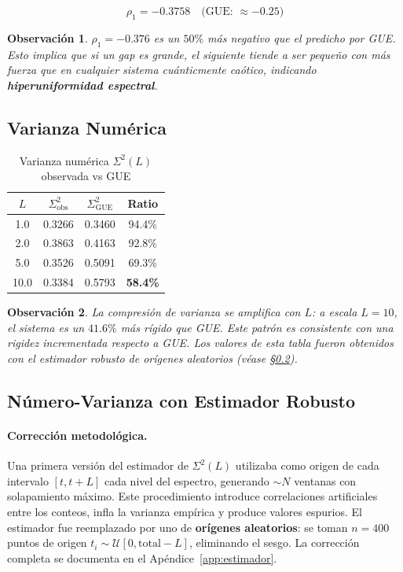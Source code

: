 \documentclass[12pt, a4paper]{article}
\newtheorem{observacion}{Observación}
\begin{document}
\[
  \rho_1 = -0.3758 \quad \text{(GUE: } \approx -0.25\text{)}
\]

\begin{observacion}
$\rho_1 = -0.376$ es un $50\%$ más negativo que el predicho por GUE.
Esto implica que si un gap es grande, el siguiente tiende a ser pequeño
con más fuerza que en cualquier sistema cuánticmente caótico, indicando
\textbf{hiperuniformidad espectral}.
\end{observacion}

\subsection{Varianza Numérica}

\begin{table}[H]
\centering
\caption{Varianza numérica $\Sigma^2(L)$ observada vs GUE}
\begin{tabular}{cccc}
\toprule
$L$ & $\Sigma^2_{\text{obs}}$ & $\Sigma^2_{\text{GUE}}$ & Ratio \\
\midrule
1.0  & 0.3266 & 0.3460 & 94.4\% \\
2.0  & 0.3863 & 0.4163 & 92.8\% \\
5.0  & 0.3526 & 0.5091 & 69.3\% \\
10.0 & 0.3384 & 0.5793 & \textcolor{anomaly}{\textbf{58.4\%}} \\
\bottomrule
\end{tabular}
\end{table}

\begin{observacion}
La compresión de varianza se amplifica con $L$: a escala $L=10$, el
sistema es un $41.6\%$ más rígido que GUE. Este patrón es consistente
con una rigidez incrementada respecto a GUE. Los valores de esta tabla
fueron obtenidos con el estimador robusto de orígenes aleatorios
(véase §\ref{sec:sigma2_robusto}).
\end{observacion}

\subsection{Número-Varianza con Estimador Robusto}
\label{sec:sigma2_robusto}

\paragraph{Corrección metodológica.}
Una primera versión del estimador de $\Sigma^2(L)$ utilizaba como origen
de cada intervalo $[t, t+L]$ cada nivel del espectro, generando
$\sim N$ ventanas con solapamiento máximo. Este procedimiento introduce
correlaciones artificiales entre los conteos, infla la varianza empírica y
produce valores espurios. El estimador fue reemplazado por uno de
\textbf{orígenes aleatorios}: se toman $n = 400$ puntos de origen
$t_i \sim \mathcal{U}[0, \text{total} - L]$, eliminando el sesgo.
La corrección completa se documenta en el Apéndice~\ref{app:estimador}.
\end{document}
